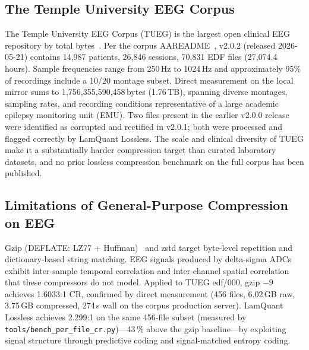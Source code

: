 \documentclass[journal]{IEEEtran}
\begin{document}
\subsection{The Temple University EEG Corpus}
The Temple University EEG Corpus (TUEG) is the largest open clinical
EEG repository by total bytes~\cite{obeid2016}. Per the corpus
AAREADME~\cite{tueg_aareadme_v202}, v2.0.2 (released 2026-05-21)
contains 14{,}987 patients, 26{,}846 sessions, 70{,}831 EDF files
(27{,}074.4 hours). Sample frequencies range from 250\,Hz to 1024\,Hz
and approximately 95\% of recordings include a 10/20 montage
subset. Direct measurement on the local mirror sums to
1{,}756{,}355{,}590{,}458\,bytes (1.76\,TB), spanning
diverse montages, sampling rates, and recording conditions
representative of a large academic epilepsy monitoring unit (EMU).
Two files present in the earlier v2.0.0 release were identified as
corrupted and rectified in v2.0.1; both were processed and flagged
correctly by LamQuant Lossless. The scale and clinical diversity of
TUEG make it a substantially harder compression target than curated
laboratory datasets, and no prior lossless compression benchmark on
the full corpus has been published.

\subsection{Limitations of General-Purpose Compression on EEG}
Gzip (DEFLATE: LZ77 + Huffman)~\cite{ziv1977,deutsch1996} and
zstd target byte-level repetition and dictionary-based string
matching. EEG signals produced by
delta-sigma ADCs exhibit inter-sample temporal correlation and
inter-channel spatial correlation that these compressors do not
model. Applied to TUEG edf/000, gzip $-9$ achieves 1.6033:1 CR,
confirmed by direct measurement (456 files, 6.02\,GB raw, 3.75\,GB
compressed, 274\,s wall on the corpus production server). LamQuant
Lossless achieves 2.299:1 on the same 456-file subset (measured
by \texttt{tools/bench\_per\_file\_cr.py})---43\,\% above the gzip
baseline---by exploiting signal
structure through predictive coding and signal-matched entropy coding.
\end{document}

